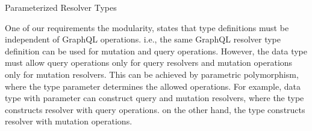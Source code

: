 \begin{frame}
\begin{alertblock}{Parameterized Resolver Types}

One of our requirements the modularity, states that type definitions must be independent of GraphQL operations. i.e., the same GraphQL resolver type definition can be used for mutation and query operations. However, the data type must allow query operations only for query resolvers and mutation operations only for mutation resolvers. This can be achieved by parametric polymorphism, where the type parameter determines the allowed operations. For example,  data type  with parameter  can construct query and mutation resolvers, where the type  constructs resolver  with query operations. on the other hand, the type  constructs resolver  with mutation operations.

\end{alertblock}
\end{frame}
